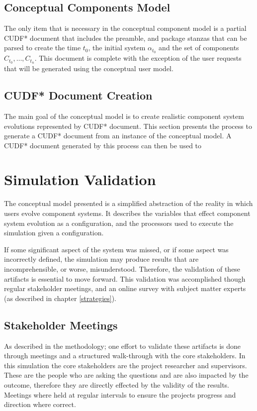 \subsection{Conceptual Components Model}
The only item that is necessary in the conceptual component model is 
a partial CUDF* document that includes the preamble, and package stanzas that can be parsed to create the time $t_0$, the initial system $\alpha_{t_0}$ and the set of components $C_{t_0},\ldots,C_{t_n}$.
This document is complete with the exception of the user requests that will be generated using the conceptual user model.


\subsection{CUDF* Document Creation}
The main goal of the conceptual model is to create realistic component system evolutions represented by CUDF* document.
This section presents the process to generate a CUDF* document from an instance of the conceptual model. 
A CUDF* document generated by this process can then be used to 


\section{Simulation Validation}
The conceptual model presented is a simplified abstraction of the reality in which users evolve component systems.
It describes the variables that effect component system evolution as a configuration,
and the processors used to execute the simulation given a configuration.

If some significant aspect of the system was missed, or if some aspect was incorrectly defined, the simulation may produce results that are incomprehensible,
or worse, misunderstood.
Therefore, the validation of these artifacts is essential to move forward. 
This validation was accomplished though regular stakeholder meetings, and an online survey with subject matter experts (as described in chapter \ref{strategies}).

\subsection{Stakeholder Meetings}
As described in the methodology; one effort to validate these artifacts is done through meetings and a structured walk-through with the core stakeholders.
In this simulation the core stakeholders are the project researcher and supervisors.
These are the people who are asking the questions and are also impacted by the outcome, therefore they are directly effected by the validity of the results.
Meetings where held at regular intervals to ensure the projects progress and direction where correct.


